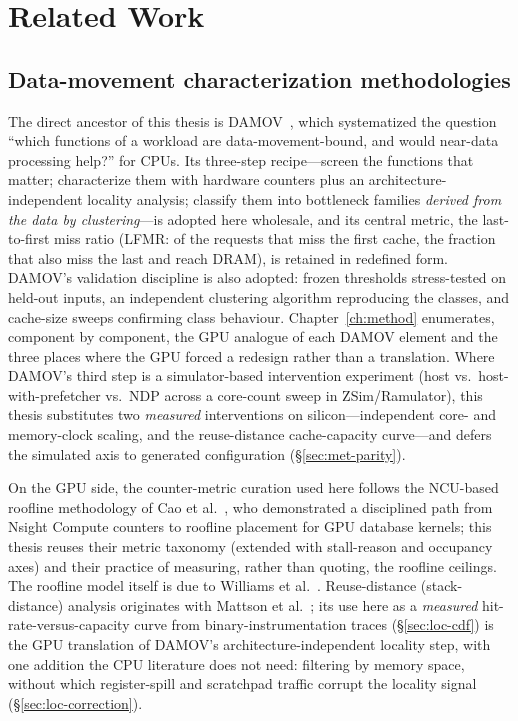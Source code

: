 \chapter{Related Work}
\label{ch:related}

\section{Data-movement characterization methodologies}

The direct ancestor of this thesis is DAMOV~\cite{oliveira2021damov}, which
systematized the question ``which functions of a workload are
data-movement-bound, and would near-data processing help?'' for CPUs. Its
three-step recipe---screen the functions that matter; characterize them with
hardware counters plus an architecture-independent locality analysis;
classify them into bottleneck families \emph{derived from the data by
clustering}---is adopted here wholesale, and its central metric, the
last-to-first miss ratio (LFMR: of the requests that miss the first cache,
the fraction that also miss the last and reach DRAM), is retained in
redefined form. DAMOV's validation discipline is also adopted: frozen
thresholds stress-tested on held-out inputs, an independent clustering
algorithm reproducing the classes, and cache-size sweeps confirming class
behaviour. Chapter~\ref{ch:method} enumerates, component by component, the
GPU analogue of each DAMOV element and the three places where the GPU forced
a redesign rather than a translation. Where DAMOV's third step is a
simulator-based intervention experiment (host vs.\ host-with-prefetcher vs.\
NDP across a core-count sweep in ZSim/Ramulator), this thesis substitutes
two \emph{measured} interventions on silicon---independent core- and
memory-clock scaling, and the reuse-distance cache-capacity curve---and
defers the simulated axis to generated configuration
(\S\ref{sec:met-parity}).

On the GPU side, the counter-metric curation used here follows the
NCU-based roofline methodology of Cao et
al.~\cite{cao2023gpudb}, who demonstrated a disciplined path from Nsight
Compute counters to roofline placement for GPU database kernels; this thesis
reuses their metric taxonomy (extended with stall-reason and occupancy axes)
and their practice of measuring, rather than quoting, the roofline ceilings.
The roofline model itself is due to Williams et
al.~\cite{williams2009roofline}. Reuse-distance (stack-distance) analysis
originates with Mattson et al.~\cite{mattson1970stack}; its use here as a
\emph{measured} hit-rate-versus-capacity curve from binary-instrumentation
traces (\S\ref{sec:loc-cdf}) is the GPU translation of DAMOV's
architecture-independent locality step, with one addition the CPU literature
does not need: filtering by memory space, without which register-spill and
scratchpad traffic corrupt the locality signal
(\S\ref{sec:loc-correction}).

